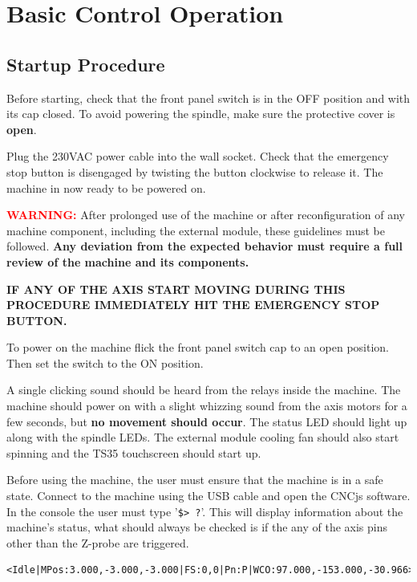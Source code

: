\documentclass[11pt, openright]{book}
\begin{document}
        \newpage





    
    

    \section{Basic Control Operation}

         \subsection{Startup Procedure}

         Before starting, check that the front panel switch is in the OFF position and with its cap closed. To avoid powering the spindle, make sure the protective cover is \textbf{open}. 

         Plug the 230VAC power cable into the wall socket. Check that the emergency stop button is disengaged by twisting the button clockwise to release it. The machine in now ready to be powered on.

          \begin{dent}{\textcolor{red}{\textbf{WARNING:}}}
             After prolonged use of the machine or after reconfiguration of any machine component, including the external module, these guidelines must be followed.
             \textbf{Any deviation from the expected behavior must require a full review of the machine and its components.}

             \textbf{IF ANY OF THE AXIS START MOVING DURING THIS PROCEDURE IMMEDIATELY HIT THE EMERGENCY STOP BUTTON.}
         \end{dent}
         \vspace{5pt}

        To power on the machine flick the front panel switch cap to an open position. Then set the switch to the ON position. 
        
        A single clicking sound should be heard from the relays inside the machine. The machine should power on with a slight whizzing sound from the axis motors for a few seconds, but\textbf{ no movement should occur}. The status LED should light up along with the spindle LEDs. The external module cooling fan should also start spinning and the TS35 touchscreen should start up.

        Before using the machine, the user must ensure that the machine is in a safe state. Connect to the machine using the USB cable and open the CNCjs software. In the console the user must type '\texttt{\$> ?}'. This will display information about the machine's status, what should always be checked is if the any of the axis pins other than the Z-probe are triggered. 
         \begin{lstlisting}
<Idle|MPos:3.000,-3.000,-3.000|FS:0,0|Pn:P|WCO:97.000,-153.000,-30.966>
        \end{lstlisting}
        
\end{document}
